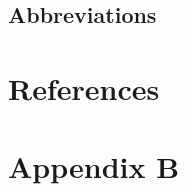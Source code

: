 \conditionalClearPage


\conditionalClearPage


\conditionalClearPage

\begin{changemargin}{0.8cm}{0.8cm}

~\vfill{}


\section*{Abbreviations}



\vskip 2.5cm

\end{changemargin}

\conditionalClearPage
\tableofcontents

\conditionalClearPage

\pagestyle{full}











\appendix
\renewcommand\chaptername{Appendix}

\chapter{References}

\printbibliography[heading=none,title={}]

\renewcommand{\thechapter}{B}
\renewcommand\chaptername{Appendix B}

\chapter{Appendix B}


